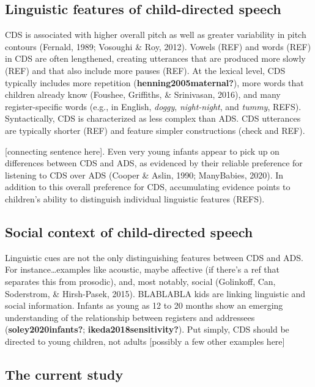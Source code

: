 \documentclass[10pt, letterpaper]{article}
\begin{document}
\hypertarget{linguistic-features-of-child-directed-speech}{%
\subsection{Linguistic features of child-directed
speech}\label{linguistic-features-of-child-directed-speech}}

CDS is associated with higher overall pitch as well as greater
variability in pitch contours (Fernald, 1989; Vosoughi \& Roy, 2012).
Vowels (REF) and words (REF) in CDS are often lengthened, creating
utterances that are produced more slowly (REF) and that also include
more pauses (REF). At the lexical level, CDS typically includes more
repetition (\textbf{henning2005maternal?}), more words that children
already know (Foushee, Griffiths, \& Srinivasan, 2016), and many
register-specific words (e.g., in English, \emph{doggy},
\emph{night-night}, and \emph{tummy}, REFS). Syntactically, CDS is
characterized as less complex than ADS. CDS utterances are typically
shorter (REF) and feature simpler constructions (check and REF).

{[}connecting sentence here{]}. Even very young infants appear to pick
up on differences between CDS and ADS, as evidenced by their reliable
preference for listening to CDS over ADS (Cooper \& Aslin, 1990;
ManyBabies, 2020). In addition to this overall preference for CDS,
accumulating evidence points to children's ability to distinguish
individual linguistic features (REFS).

\hypertarget{social-context-of-child-directed-speech}{%
\subsection{Social context of child-directed
speech}\label{social-context-of-child-directed-speech}}

Linguistic cues are not the only distinguishing features between CDS and
ADS. For instance\ldots examples like acoustic, maybe affective (if
there's a ref that separates this from prosodic), and, most notably,
social (Golinkoff, Can, Soderstrom, \& Hirsh-Pasek, 2015). BLABLABLA
kids are linking linguistic and social information. Infants as young as
12 to 20 months show an emerging understanding of the relationship
between registers and addressees (\textbf{soley2020infants?};
\textbf{ikeda2018sensitivity?}). Put simply, CDS should be directed to
young children, not adults {[}possibly a few other examples here{]}

\hypertarget{the-current-study}{%
\subsection{The current study}\label{the-current-study}}
\end{document}
